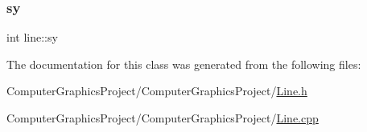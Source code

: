\mbox{\label{classline_afd9ace37f8fe42bf6438208f6acfae74}} 
\subsubsection{\texorpdfstring{sy}{sy}}
{\footnotesize\ttfamily int line\+::sy\hspace{0.3cm}{\ttfamily [private]}}



The documentation for this class was generated from the following files\+:\begin{DoxyCompactItemize}
\item 
Computer\+Graphics\+Project/\+Computer\+Graphics\+Project/\hyperlink{_line_8h}{Line.\+h}\item 
Computer\+Graphics\+Project/\+Computer\+Graphics\+Project/\hyperlink{_line_8cpp}{Line.\+cpp}\end{DoxyCompactItemize}
